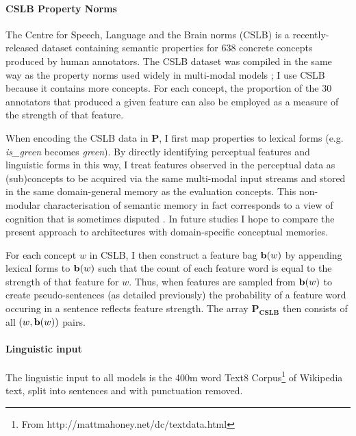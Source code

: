 \paragraph{CSLB Property Norms} The Centre for Speech, Language and the Brain norms (CSLB) \citep{devereux2013centre} is a recently-released dataset containing semantic properties for 638 concrete concepts produced by human annotators. The CSLB dataset was compiled in the same way as the \cite{mcrae2005semantic} property norms used widely in multi-modal models \citep{silberer2012grounded,rollermultimodal}; I use CSLB because it contains more concepts. For each concept, the proportion of the 30 annotators that produced a given feature can also be employed as a measure of the strength of that feature.

When encoding the CSLB data in \(\mathbf{P}\), I first map properties to lexical forms (e.g. \emph{is\_green} becomes \emph{green}). By directly identifying perceptual features and linguistic forms in this way, I treat features observed in the perceptual data as (sub)concepts to be acquired via the same multi-modal input streams and stored in the same domain-general memory as the evaluation concepts. This non-modular characterisation of semantic memory  in fact corresponds to a view of cognition that is sometimes disputed \citep{fodor1983modularity}. In future studies I hope to compare the present approach to architectures with domain-specific conceptual memories. 

For each concept \(w\) in CSLB, I then construct a feature bag \({\bf b}(w)\) by appending lexical forms to \({\bf b}(w)\) such that the count of each feature word is equal to the strength of that feature for \(w\). Thus, when features are sampled from \({\bf b}(w)\) to create pseudo-sentences (as detailed previously) the probability of a feature word occuring in a sentence reflects feature strength. The array \(\mathbf{P_{CSLB}}\) then consists of all \( (w,  {\bf b}(w) ) \) pairs.

\paragraph{Linguistic input} The linguistic input to all models is the 400m word Text8 Corpus\footnote{From http://mattmahoney.net/dc/textdata.html} of Wikipedia text, split into sentences and with punctuation removed. 



